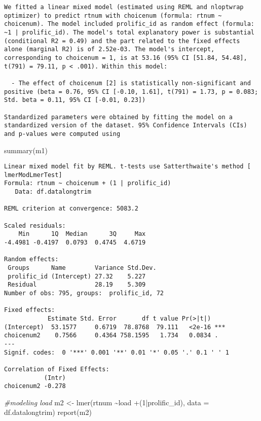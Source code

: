 \documentclass[
]{article}
\newenvironment{Shaded}{\begin{snugshade}}{\end{snugshade}}
\newcommand{\AttributeTok}[1]{\textcolor[rgb]{0.77,0.63,0.00}{#1}}
\newcommand{\CommentTok}[1]{\textcolor[rgb]{0.56,0.35,0.01}{\textit{#1}}}
\newcommand{\DecValTok}[1]{\textcolor[rgb]{0.00,0.00,0.81}{#1}}
\newcommand{\FunctionTok}[1]{\textcolor[rgb]{0.00,0.00,0.00}{#1}}
\newcommand{\NormalTok}[1]{#1}
\newcommand{\OtherTok}[1]{\textcolor[rgb]{0.56,0.35,0.01}{#1}}
\newcommand{\SpecialCharTok}[1]{\textcolor[rgb]{0.00,0.00,0.00}{#1}}
\begin{document}
\begin{verbatim}
We fitted a linear mixed model (estimated using REML and nloptwrap optimizer) to predict rtnum with choicenum (formula: rtnum ~ choicenum). The model included prolific_id as random effect (formula: ~1 | prolific_id). The model's total explanatory power is substantial (conditional R2 = 0.49) and the part related to the fixed effects alone (marginal R2) is of 2.52e-03. The model's intercept, corresponding to choicenum = 1, is at 53.16 (95% CI [51.84, 54.48], t(791) = 79.11, p < .001). Within this model:

  - The effect of choicenum [2] is statistically non-significant and positive (beta = 0.76, 95% CI [-0.10, 1.61], t(791) = 1.73, p = 0.083; Std. beta = 0.11, 95% CI [-0.01, 0.23])

Standardized parameters were obtained by fitting the model on a standardized version of the dataset. 95% Confidence Intervals (CIs) and p-values were computed using 
\end{verbatim}

\begin{Shaded}
\begin{Highlighting}[]
\FunctionTok{summary}\NormalTok{(m1)}
\end{Highlighting}
\end{Shaded}

\begin{verbatim}
Linear mixed model fit by REML. t-tests use Satterthwaite's method [
lmerModLmerTest]
Formula: rtnum ~ choicenum + (1 | prolific_id)
   Data: df.datalongtrim

REML criterion at convergence: 5083.2

Scaled residuals: 
    Min      1Q  Median      3Q     Max 
-4.4981 -0.4197  0.0793  0.4745  4.6719 

Random effects:
 Groups      Name        Variance Std.Dev.
 prolific_id (Intercept) 27.32    5.227   
 Residual                28.19    5.309   
Number of obs: 795, groups:  prolific_id, 72

Fixed effects:
            Estimate Std. Error       df t value Pr(>|t|)    
(Intercept)  53.1577     0.6719  78.8768  79.111   <2e-16 ***
choicenum2    0.7566     0.4364 758.1595   1.734   0.0834 .  
---
Signif. codes:  0 '***' 0.001 '**' 0.01 '*' 0.05 '.' 0.1 ' ' 1

Correlation of Fixed Effects:
           (Intr)
choicenum2 -0.278
\end{verbatim}

\begin{Shaded}
\begin{Highlighting}[]
\CommentTok{\#modeling load }
\NormalTok{m2 }\OtherTok{\textless{}{-}} \FunctionTok{lmer}\NormalTok{(rtnum }\SpecialCharTok{\textasciitilde{}}\NormalTok{load }\SpecialCharTok{+}\NormalTok{(}\DecValTok{1}\SpecialCharTok{|}\NormalTok{prolific\_id),}
           \AttributeTok{data =}\NormalTok{ df.datalongtrim)}
\FunctionTok{report}\NormalTok{(m2)}
\end{Highlighting}
\end{Shaded}
\end{document}
